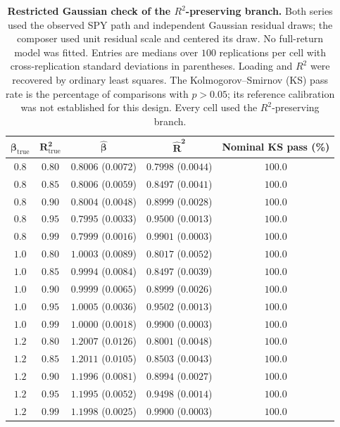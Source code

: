 \begin{table}[H]
\centering
\caption{\textbf{Restricted Gaussian check of the $R^2$-preserving
    branch.} Both series used the observed SPY path and independent
    Gaussian residual draws; the composer used unit residual scale and
    centered its draw. No full-return model was fitted. Entries are
    medians over $100$ replications per cell with cross-replication
    standard deviations in parentheses. Loading and $R^2$ were recovered
    by ordinary least squares. The Kolmogorov--Smirnov (KS) pass
    rate is the percentage of comparisons with $p>0.05$; its reference
    calibration was not established for this design. Every cell used
    the $R^2$-preserving branch.}
\label{tab:tracker_grid}
\small
\begin{tabular}{@{}ccccc@{}}
\toprule
$\boldsymbol{\beta_{\mathrm{true}}}$ &
$\boldsymbol{R^2_{\mathrm{true}}}$ &
$\boldsymbol{\hat\beta}$ & $\boldsymbol{\hat R^2}$ &
\textbf{Nominal KS pass (\%)} \\ \midrule
$0.8$ & $0.80$ & $0.8006$ ($0.0072$) & $0.7998$ ($0.0044$) & $100.0$ \\
$0.8$ & $0.85$ & $0.8006$ ($0.0059$) & $0.8497$ ($0.0041$) & $100.0$ \\
$0.8$ & $0.90$ & $0.8004$ ($0.0048$) & $0.8999$ ($0.0028$) & $100.0$ \\
$0.8$ & $0.95$ & $0.7995$ ($0.0033$) & $0.9500$ ($0.0013$) & $100.0$ \\
$0.8$ & $0.99$ & $0.7999$ ($0.0016$) & $0.9901$ ($0.0003$) & $100.0$ \\ \midrule
$1.0$ & $0.80$ & $1.0003$ ($0.0089$) & $0.8017$ ($0.0052$) & $100.0$ \\
$1.0$ & $0.85$ & $0.9994$ ($0.0084$) & $0.8497$ ($0.0039$) & $100.0$ \\
$1.0$ & $0.90$ & $0.9999$ ($0.0065$) & $0.8999$ ($0.0026$) & $100.0$ \\
$1.0$ & $0.95$ & $1.0005$ ($0.0036$) & $0.9502$ ($0.0013$) & $100.0$ \\
$1.0$ & $0.99$ & $1.0000$ ($0.0018$) & $0.9900$ ($0.0003$) & $100.0$ \\ \midrule
$1.2$ & $0.80$ & $1.2007$ ($0.0126$) & $0.8001$ ($0.0048$) & $100.0$ \\
$1.2$ & $0.85$ & $1.2011$ ($0.0105$) & $0.8503$ ($0.0043$) & $100.0$ \\
$1.2$ & $0.90$ & $1.1996$ ($0.0081$) & $0.8994$ ($0.0027$) & $100.0$ \\
$1.2$ & $0.95$ & $1.1995$ ($0.0052$) & $0.9498$ ($0.0014$) & $100.0$ \\
$1.2$ & $0.99$ & $1.1998$ ($0.0025$) & $0.9900$ ($0.0003$) & $100.0$ \\
\bottomrule
\end{tabular}
\end{table}

